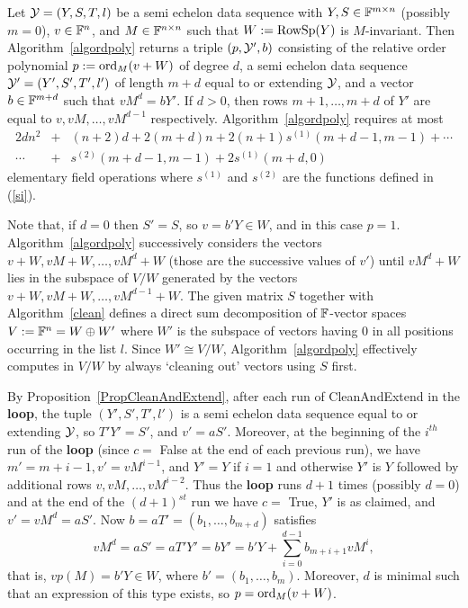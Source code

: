 \begin{Prop}
\label{proprelorderpol}
Let $\mathcal{Y}=(Y,S,T,l)$ be a semi echelon data sequence with $Y,S \in \mathbb{F}^{m \times
n}$ (possibly $m=0$), $v \in \mathbb{F}^n$, and $M \in \mathbb{F}^{n \times n}$
such that $W:=\mathrm{RowSp}(Y)$ is $M$-invariant. 
Then  Algorithm~\ref{algordpoly} returns a triple  $(p,\mathcal{Y}',b)$ 
consisting of the relative order polynomial $p := \mathrm{ord}_M(v+W)$ of degree $d$, a 
semi echelon data sequence $\mathcal{Y}'=(Y',S',T',l')$ of length $m+d$ equal to or extending $\mathcal{Y}$, 
and a vector $b \in \mathbb{F}^{m+d}$ such that $vM^d = bY'$. If $d>0$, then
rows $m+1, \ldots, m+d$ of $Y'$ are equal to $v,vM,\ldots,vM^{d-1}$
respectively. Algorithm~\ref{algordpoly} requires at most
\begin{eqnarray*}
2dn^2 &+& (n+2)d +2(m+d)n 
+ 2(n+1)s^{(1)}(m+d-1,m-1) + \cdots \\
\cdots &+& s^{(2)}(m+d-1,m-1) 
+ 2s^{(1)}(m+d,0)
\end{eqnarray*}
elementary field operations where $s^{(1)}$ and $s^{(2)}$ are the
functions defined in (\ref{si}).
\end{Prop}

\begin{Rem}
Note that, if $d=0$ then $S'=S$, so $v=b'Y\in W$, and in this case $p=1$. 
Algorithm~\ref{algordpoly} successively considers the vectors $v+W,
vM+W, \ldots, vM^d+W$  (those are the successive values of
$v'$) until $vM^d+W$ lies in the subspace of $V/W$ 
generated by the vectors $v+W, vM+W, \ldots, vM^{d-1}+W$. 
The given matrix $S$ together with Algorithm~\ref{clean} defines a
direct sum decomposition of $\mathbb{F}$-vector spaces $V := \mathbb{F}^n = W \oplus W'$
where $W'$ is the subspace of vectors having $0$ in all positions
occurring in the list $l$. Since $W' \cong V/W$, 
Algorithm~\ref{algordpoly} effectively computes in $V/W$ by always `cleaning
out' vectors using $S$ first. 
\end{Rem}

By Proposition~\ref{PropCleanAndExtend}, after each run of 
{\sc CleanAndExtend} in the \textbf{loop}, the tuple 
$(Y',S',T',l')$ is a semi echelon 
data sequence equal to or extending $\mathcal{Y}$, so $T'Y'=S'$, and $v'=aS'$. 
Moreover, at the beginning of the $i^{th}$ run of the  \textbf{loop} (since $c=$ 
{\sc False} at the end of each previous run), we have
$m'=m+i-1, v'=vM^{i-1}$,  and $Y'=Y$ if $i=1$ and otherwise $Y'$ is $Y$ 
followed by additional rows $v,vM,\dots,vM^{i-2}$. Thus the  \textbf{loop}
runs $d+1$ times (possibly $d=0$) and at the end of the $(d+1)^{st}$ run 
we have $c=$ {\sc True}, $Y'$ is as claimed, and $v'=vM^d=aS'$. Now $b=aT'=(b_1,\dots,b_{m+d})$ satisfies
\[
vM^d=aS'=aT'Y'=bY'=b'Y+\sum_{i=0}^{d-1}b_{m+i+1}vM^i,
\]
that is, $vp(M)=b'Y\in W$, where $b'=(b_1,\dots,b_m)$. Moreover, $d$ is minimal 
such that an expression of this type exists, so $p=\mathrm{ord}_M(v+W)$.  


